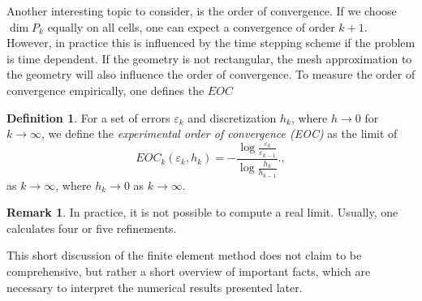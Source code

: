 \documentclass[12pt,a4paper,twoside, open=right]{scrreprt}
\theoremstyle{definition}
\newtheorem{rem}[auf]{Remark}
\newtheorem{defn}[auf]{Definition}
\theoremstyle{plain}
\begin{document}
Another interesting topic to consider, is the order of convergence. If we choose $\dim P_k$ equally on all cells, one can expect a convergence of order $k+1$. However, in practice this is influenced by the time stepping scheme if the problem is time dependent. If the geometry is not rectangular, the mesh approximation to the geometry will also influence the order of convergence. To measure the order of convergence empirically, one defines the $EOC$
\begin{defn}
    For a set of errors $\varepsilon_k$ and discretization $h_k$, where $h\to 0$ for $k\to\infty$, we define the \emph{experimental order of convergence (EOC)} as the limit of 
    \begin{equation}
        EOC_k(\varepsilon_k,h_k)=-\frac{\log\frac{\varepsilon_k}{\varepsilon_{k-1}}}{\log{\frac{h_k}{h_{k-1}}}}.\label{eq:EOC},
    \end{equation} 
    as $k\to\infty$, where $h_k\to 0$ as $k\to\infty$.
\end{defn}
\begin{rem}
    In practice, it is not possible to compute a real limit. Usually, one calculates four or five refinements.
\end{rem}
This short discussion of the finite element method does not claim to be comprehensive, but rather a short overview of important facts, which are necessary to interpret the numerical results presented later.  
\end{document}

